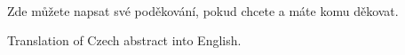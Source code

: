 \documentclass[11pt,twoside,a4paper]{book}
\begin{document}
	\translate				%


	\coverpagestarts

	\newpage~
	
	\newpage

	\acknowledgements
	\noindent
	Zde můžete napsat své poděkování, pokud chcete a máte komu děkovat.




 
	\abstractpage

	Translation of Czech abstract into English.


	\baselineskip
\end{document}
